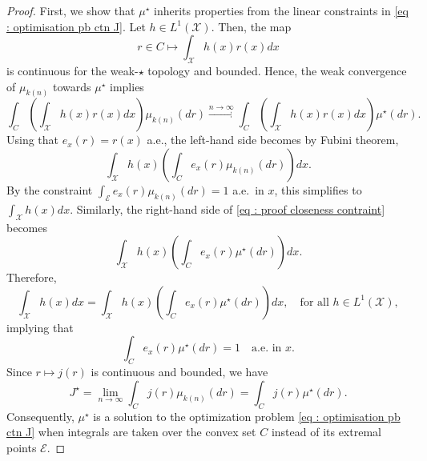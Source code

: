 \documentclass[a4paper, 11pt]{article}
\theoremstyle{definition}
\newcommand{\theconvex}{C}
\begin{document}
{\begin{proof}
First, we show that $\mu^\star$ inherits properties from the linear constraints in \eqref{eq : optimisation pb ctn J}. Let $h \in L^1(\mathcal{X})$. Then, the map 
\[
r \in \theconvex \mapsto \int_\mathcal{X} h(x) r(x) dx
\]
is continuous for the weak-$\star$ topology and bounded. Hence, the weak convergence of $\mu_{k(n)}$ towards $ \mu^\star$ implies
\begin{equation} \label{eq : proof closeness contraint}
\int_\theconvex \left( \int_\mathcal{X} h(x) r(x) dx \right) \mu_{k(n)}(dr) \xrightarrow{n \to \infty} \int_\theconvex \left( \int_\mathcal{X} h(x) r(x) dx \right) \mu^\star(dr).
\end{equation}
Using that $e_x(r) = r(x)$ a.e., the left-hand side becomes by Fubini theorem,
\[
\int_\mathcal{X} h(x) \left( \int_\theconvex e_x(r) \mu_{k(n)}(dr) \right) dx.
\]
By the constraint $\int_\mathcal{E} e_x(r) \mu_{k(n)}(dr) = 1$ a.e.\ in $x$, this simplifies to $\int_\mathcal{X} h(x) dx$. Similarly, the right-hand side of \eqref{eq : proof closeness contraint} becomes
\[
\int_\mathcal{X} h(x) \left( \int_\theconvex e_x(r) \mu^\star(dr) \right) dx.
\]
Therefore,
\[
\int_\mathcal{X} h(x) dx = \int_\mathcal{X} h(x) \left( \int_\theconvex e_x(r) \mu^\star(dr) \right) dx, \quad \text{for all } h \in L^1(\mathcal{X}),
\]
implying that
\[
\int_\theconvex e_x(r) \mu^\star(dr) = 1 \quad \text{a.e.\ in } x.
\]
Since $r \mapsto j(r)$ is continuous and bounded, we have
\[
J^\star = \lim_{n \to \infty} \int_\theconvex j(r) \mu_{k(n)}(dr) = \int_\theconvex j(r) \mu^\star(dr).
\]
Consequently, $\mu^\star$ is a solution to the optimization problem \eqref{eq : optimisation pb ctn J} when integrals are taken over the convex set $\theconvex$ instead of its extremal points $\mathcal{E}$.

\medskip


\end{proof}}
\end{document}
